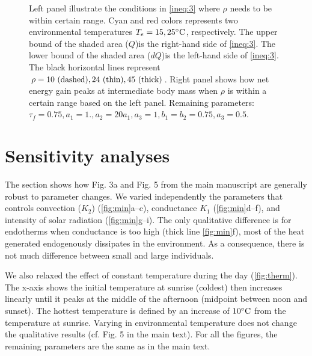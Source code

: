 \documentclass[11pt]{article}
\begin{document}
\begin{figure}
\begin{center}
	\caption{Left panel illustrate the conditions in \cref{ineq:3} where $\rho$ needs to be within certain range.
	Cyan and red colors represents two environmental temperatures $T_e = 15, 25^\circ \rm{C}$, respectively.
  The upper bound of the shaded area ($Q$)is the right-hand side of \cref{ineq:3}.
  The lower bound of the shaded area ($dQ$)is the left-hand side of \cref{ineq:3}.
  The black horizontal lines represent $\rho = 10 \textnormal{ (dashed)}, 24 \textnormal{ (thin)}, 45 \textnormal{ (thick)}$.
  Right panel shows how net energy gain peaks at intermediate body mass when $\rho$ is within a certain range based on the left panel.
  Remaining parameters: $\tau_f = 0.75, a_1 = 1., a_2 = 20 a_1, a_3 = 1, b_1 = b_2 = 0.75, a_3 = 0.5$.
	}
	\label{fig:ana}
\end{center}
\end{figure}

\section{Sensitivity analyses}
The section shows how Fig. 3a and Fig. 5 from the main manuscript are generally robust to parameter changes.
We varied independently the parameters that controls convection ($K_2$) (\cref{fig:min}a--c), conductance $K_1$ (\cref{fig:min}d--f), and intensity of solar radiation (\cref{fig:min}g--i).
The only qualitative difference is for endotherms when conductance is too high (thick line \cref{fig:min}f), most of the heat generated endogenously dissipates in the environment.
As a consequence, there is not much difference between small and large individuals.

We also relaxed the effect of constant temperature during the day (\cref{fig:therm}).
The x-axis shows the initial temperature at sunrise (coldest) then increases linearly until it peaks at the middle of the afternoon (midpoint between noon and sunset). The hottest temperature is defined by an increase of $10 ^{\circ}\rm{C}$ from the temperature at sunrise.
Varying in environmental temperature does not change the qualitative results (cf. Fig. 5 in the main text).
For all the figures, the remaining parameters are the same as in the main text.
\end{document}
